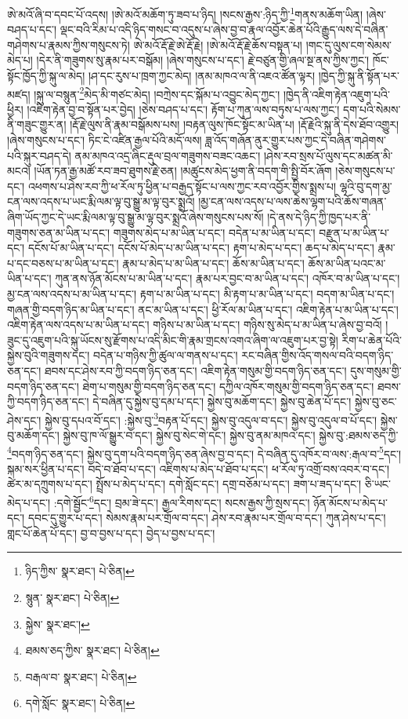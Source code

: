 ཨེ་མའོ་ཞི་བ་དབང་པོ་འདས། །ཨེ་མའོ་མཆོག་ཏུ་ཟབ་པ་ཉིད། །སངས་རྒྱས་:ཉིད་ཀྱི་\footnote{ཉིད་ཀྱིས་  སྣར་ཐང་།  པེ་ཅིན། }གནས་མཆོག་ཡིན། །ཞེས་བཤད་པ་དང་། ལྡང་བའི་རིམ་པ་འདི་ཉིད་གསང་བ་འདུས་པ་ཞེས་བྱ་བ་རྣལ་འབྱོར་ཆེན་པོའི་རྒྱུད་ལས་དེ་བཞིན་གཤེགས་པ་རྣམས་ཀྱིས་གསུངས་ཏེ། ཨེ་མའོ་རྡོ་རྗེ་ཨེ་རྡོ་རྗེ། །ཨེ་མའོ་རྡོ་རྗེ་ཆོས་བསྟན་པ། །གང་དུ་ལུས་ངག་སེམས་མེད་པ། །དེར་ནི་གཟུགས་སུ་རྣམ་པར་བསྒོམ། །ཞེས་གསུངས་པ་དང་། རྗེ་བཙུན་གྱི་ཞལ་སྔ་ནས་ཀྱིས་ཀྱང་། ཁོང་སྟོང་ཁྱོད་ཀྱི་སྐུ་ལ་མེད། །ཤ་དང་རུས་པ་ཁྲག་ཀྱང་མེད། །ནམ་མཁའ་ལ་ནི་འཇའ་ཚོན་ལྟར། །ཁྱེད་ཀྱི་སྐུ་ནི་སྟོན་པར་མཛད། །སྐུ་ལ་བསྙུན་\footnote{སྙུན་  སྣར་ཐང་།  པེ་ཅིན། }མེད་མི་གཙང་མེད། །བཀྲེས་དང་སྐོམ་པ་འབྱུང་མེད་ཀྱང་། །ཁྱེད་ནི་འཇིག་རྟེན་འཇུག་པའི་ཕྱིར། །འཇིག་རྟེན་བྱ་བ་སྟོན་པར་བྱེད། །ཅེས་བཤད་པ་དང་། རྟོག་པ་ཀུན་ལས་བཏུས་པ་ལས་ཀྱང་། དག་པའི་སེམས་ནི་གཟུང་གྱུར་ན། །རྡོ་རྗེ་ལུས་ནི་རྣམ་བསྒོམས་པས། །བརྟན་ལུས་ཁོང་སྟོང་མ་ཡིན་པ། །རྡོ་རྗེའི་སྐུ་ནི་དེས་ཐོབ་འགྱུར། །ཞེས་གསུངས་པ་དང་། ཏིང་ངེ་འཛིན་རྒྱལ་པོའི་མདོ་ལས། ཟླ་འོད་གཞོན་ནུར་གྱུར་པས་ཀྱང་དེ་བཞིན་གཤེགས་པའི་སྐུར་བཤད་དེ། ནམ་མཁའ་འདྲ་ཞིང་རྡུལ་བྲལ་གཟུགས་བཟང་འཆང་། །ཤེས་རབ་སྲས་པོ་ལུས་དང་མཚན་མི་མངའ། །ཡོན་ཏན་རྒྱ་མཚོ་རབ་ཟབ་ཐུགས་རྗེ་ཅན། །མཚུངས་མེད་ཕྱག་ནི་བདག་གི་སྤྱི་བོར་ཞོག །ཅེས་གསུངས་པ་དང་། འཕགས་པ་ཤེས་རབ་ཀྱི་ཕ་རོལ་ཏུ་ཕྱིན་པ་བརྒྱད་སྟོང་པ་ལས་ཀྱང་རབ་འབྱོར་གྱིས་སྨྲས་པ། ལྷའི་བུ་དག་མྱ་ངན་ལས་འདས་པ་ཡང་རྨི་ལམ་ལྟ་བུ་སྒྱུ་མ་ལྟ་བུར་སྨྲའོ། །མྱ་ངན་ལས་འདས་པ་ལས་ཆེས་ལྷག་པའི་ཆོས་གཞན་ཞིག་ཡོད་ཀྱང་དེ་ཡང་རྨི་ལམ་ལྟ་བུ་སྒྱུ་མ་ལྟ་བུར་སྨྲའོ་ཞེས་གསུངས་པས་སོ། །དེ་ནས་དེ་ཉིད་ཀྱི་ཁྱད་པར་ནི་གཟུགས་ཅན་མ་ཡིན་པ་དང་། གཟུགས་མེད་པ་མ་ཡིན་པ་དང་། བདེན་པ་མ་ཡིན་པ་དང་། བརྫུན་པ་མ་ཡིན་པ་དང་། དངོས་པོ་མ་ཡིན་པ་དང་། དངོས་པོ་མེད་པ་མ་ཡིན་པ་དང་། རྟག་པ་མེད་པ་དང་། ཆད་པ་མེད་པ་དང་། རྣམ་པ་དང་བཅས་པ་མ་ཡིན་པ་དང་། རྣམ་པ་མེད་པ་མ་ཡིན་པ་དང་། ཆོས་མ་ཡིན་པ་དང་། ཆོས་མ་ཡིན་པའང་མ་ཡིན་པ་དང་། ཀུན་ནས་ཉོན་མོངས་པ་མ་ཡིན་པ་དང་། རྣམ་པར་བྱང་བ་མ་ཡིན་པ་དང་། འཁོར་བ་མ་ཡིན་པ་དང་། མྱ་ངན་ལས་འདས་པ་མ་ཡིན་པ་དང་། རྟག་པ་མ་ཡིན་པ་དང་། མི་རྟག་པ་མ་ཡིན་པ་དང་། བདག་མ་ཡིན་པ་དང་། གཞན་གྱི་བདག་ཉིད་མ་ཡིན་པ་དང་། ནང་མ་ཡིན་པ་དང་། ཕྱི་རོལ་མ་ཡིན་པ་དང་། འཇིག་རྟེན་པ་མ་ཡིན་པ་དང་། འཇིག་རྟེན་ལས་འདས་པ་མ་ཡིན་པ་དང་། གཉིས་པ་མ་ཡིན་པ་དང་། གཉིས་སུ་མེད་པ་མ་ཡིན་པ་ཞེས་བྱ་བའོ། །ཟུང་དུ་འཇུག་པའི་སྐུ་ཡོངས་སུ་རྫོགས་པ་འདི་མིང་གི་རྣམ་གྲངས་འགའ་ཞིག་ལ་འཇུག་པར་བྱ་སྟེ། རིག་པ་ཆེན་པོའི་སྐྱེས་བུའི་གཟུགས་དང་། བདེན་པ་གཉིས་ཀྱི་ཚུལ་ལ་གནས་པ་དང་། རང་བཞིན་གྱིས་འོད་གསལ་བའི་བདག་ཉིད་ཅན་དང་། ཐབས་དང་ཤེས་རབ་ཀྱི་བདག་ཉིད་ཅན་དང་། འཇིག་རྟེན་གསུམ་གྱི་བདག་ཉིད་ཅན་དང་། དུས་གསུམ་གྱི་བདག་ཉིད་ཅན་དང་། ཐེག་པ་གསུམ་གྱི་བདག་ཉིད་ཅན་དང་། དཀྱིལ་འཁོར་གསུམ་གྱི་བདག་ཉིད་ཅན་དང་། ཐབས་ཀྱི་བདག་ཉིད་ཅན་དང་། དེ་བཞིན་དུ་སྐྱེས་བུ་དམ་པ་དང་། སྐྱེས་བུ་མཆོག་དང་། སྐྱེས་བུ་ཆེན་པོ་དང་། སྐྱེས་བུ་ཅང་ཤེས་དང་། སྐྱེས་བུ་དཔའ་བོ་དང་། :སྐྱེས་བུ་\footnote{སྐྱེས་  སྣར་ཐང་། }བརྟན་པོ་དང་། སྐྱེས་བུ་འདུལ་བ་དང་། སྐྱེས་བུ་འདུལ་བ་པོ་དང་། སྐྱེས་བུ་མཆོག་དང་། སྐྱེས་བུ་ཁ་ལོ་སྒྱུར་བ་དང་། སྐྱེས་བུ་སེང་གེ་དང་། སྐྱེས་བུ་ནམ་མཁའ་དང་། སྐྱེས་བུ་:ཐམས་ཅད་ཀྱི་\footnote{ཐམས་ཅད་ཀྱིས་  སྣར་ཐང་།  པེ་ཅིན། }བདག་ཉིད་ཅན་དང་། སྐྱེས་བུ་དག་པའི་བདག་ཉིད་ཅན་ཞེས་བྱ་བ་དང་། དེ་བཞིན་དུ་འཁོར་བ་ལས་:རྒལ་བ་\footnote{བརྒལ་བ་  སྣར་ཐང་།  པེ་ཅིན། }དང་། སྐམ་སར་ཕྱིན་པ་དང་། བདེ་བ་ཐོབ་པ་དང་། འཇིགས་པ་མེད་པ་ཐོབ་པ་དང་། ཕ་རོལ་ཏུ་འགྲོ་བས་འབར་བ་དང་། ཚེར་མ་དཀྲུགས་པ་དང་། སྤྲོས་པ་མེད་པ་དང་། དགེ་སློང་དང་། དགྲ་བཅོམ་པ་དང་། ཟག་པ་ཟད་པ་དང་། ཅི་ཡང་མེད་པ་དང་། :དགེ་སྦྱོང་\footnote{དགེ་སློང་  སྣར་ཐང་།  པེ་ཅིན། }དང་། བྲམ་ཟེ་དང་། རྒྱལ་རིགས་དང་། སངས་རྒྱས་ཀྱི་སྲས་དང་། ཉོན་མོངས་པ་མེད་པ་དང་། དབང་དུ་གྱུར་པ་དང་། སེམས་རྣམ་པར་གྲོལ་བ་དང་། ཤེས་རབ་རྣམ་པར་གྲོལ་བ་དང་། ཀུན་ཤེས་པ་དང་། གླང་པོ་ཆེན་པོ་དང་། བྱ་བ་བྱས་པ་དང་། བྱེད་པ་བྱས་པ་དང་། 